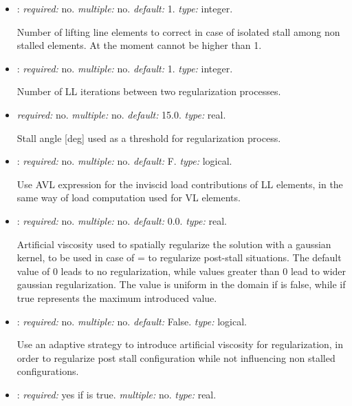 \begin{itemize}
\item {}: \textit{required:} no. 
\textit{multiple:} no. \textit{default:} 1. \textit{type:} integer.

Number of lifting line elements to correct in case of isolated 
stall among non stalled elements. At the moment cannot be higher than 1.

\item {}: \textit{required:} no. 
\textit{multiple:} no. \textit{default:} 1. \textit{type:} integer.

Number of LL iterations between two regularization processes.

\item {} \textit{required:} no. 
\textit{multiple:} no. \textit{default:} 15.0. \textit{type:} real.

Stall angle [deg] used as a threshold for regularization process. 

\item {}: \textit{required:} no. \textit{multiple:} no. 
\textit{default:} F. \textit{type:} logical.

Use AVL expression for the inviscid load contributions of LL elements, 
in the same way of load computation used for VL elements. 

\item {}: \textit{required:} no. 
\textit{multiple:} no. \textit{default:} 0.0. \textit{type:} real.

Artificial viscosity used to spatially regularize the solution with 
a gaussian kernel, to be used in case of  =  
to regularize post-stall situations. The default value of 0 leads to no 
regularization, while values greater than 0 lead to wider gaussian regularization. 
The value is uniform in the domain if  is 
false, while if true represents the maximum introduced value.

\item {}: \textit{required:} no. 
\textit{multiple:} no. \textit{default:} False. \textit{type:} logical.

Use an adaptive strategy to introduce artificial viscosity for regularization, 
in order to regularize post stall configuration while not influencing non 
stalled configurations. 

\item {}: \textit{required:} yes if 
 is true. \textit{multiple:} no. \textit{type:} real.


\end{itemize}
